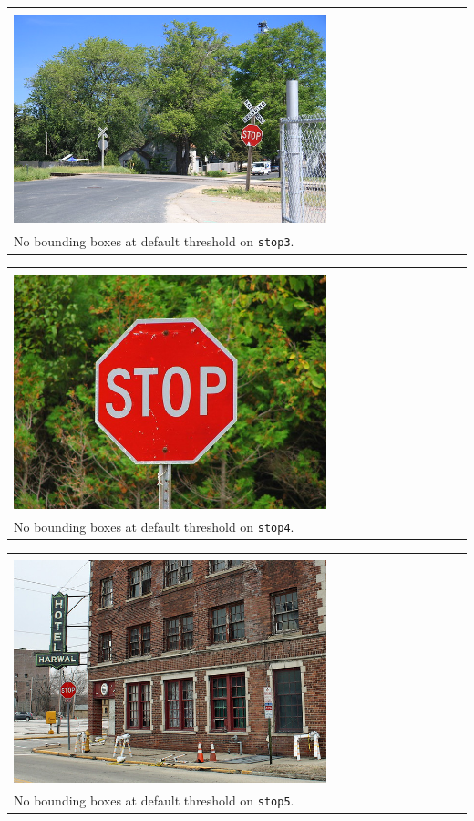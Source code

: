 \documentclass{article}
\begin{document}
\begin{enumerate}[label=(\roman*)]
\begin{tabular}[t]{l}
	\hline \\
	\includegraphics[width=0.7\textwidth]{img/stop3_detection.png} \\
	No bounding boxes at default threshold on \texttt{stop3}. \\
	\hline
\end{tabular}

\begin{tabular}[t]{l}
	\hline \\
	\includegraphics[width=0.7\textwidth]{img/stop4_detection.png} \\
	No bounding boxes at default threshold on \texttt{stop4}. \\
	\hline
\end{tabular}

\begin{tabular}[t]{l}
	\hline \\
	\includegraphics[width=0.7\textwidth]{img/stop5_detection.png} \\
	No bounding boxes at default threshold on \texttt{stop5}. \\
	\hline
\end{tabular}

\end{enumerate}
\end{document}
